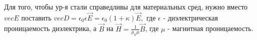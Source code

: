 \documentclass[__main__.tex]{subfiles}
\begin{document}
Для того, чтобы ур-я стали справедливы для материальных сред, нужно вместо $vec E$ поставить $vec D = \epsilon_0\epsilon\vec E = \epsilon_0(1+\kappa)\vec E,$ где $\epsilon$ - диэлектрическая проницаемость диэлектрика, а $\vec B$ на $\vec H = \frac{1}{\mu_0\mu}\vec B$, где $\mu$ - магнитная проницаемость.
\end{document}
